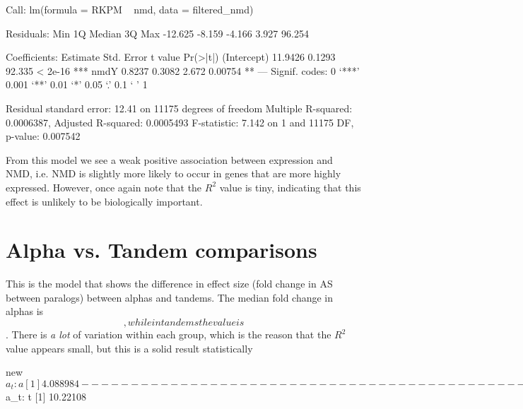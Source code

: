 \documentclass{article}
\begin{document}
\begin{Schunk}
\begin{Soutput}
Call:
lm(formula = RKPM ~ nmd, data = filtered_nmd)

Residuals:
    Min      1Q  Median      3Q     Max 
-12.625  -8.159  -4.166   3.927  96.254 

Coefficients:
            Estimate Std. Error t value Pr(>|t|)    
(Intercept)  11.9426     0.1293  92.335  < 2e-16 ***
nmdY          0.8237     0.3082   2.672  0.00754 ** 
---
Signif. codes:  0 ‘***’ 0.001 ‘**’ 0.01 ‘*’ 0.05 ‘.’ 0.1 ‘ ’ 1

Residual standard error: 12.41 on 11175 degrees of freedom
Multiple R-squared:  0.0006387,	Adjusted R-squared:  0.0005493 
F-statistic: 7.142 on 1 and 11175 DF,  p-value: 0.007542
\end{Soutput}
\end{Schunk}

From this model we see a weak positive association between expression and NMD, i.e. NMD is slightly more likely to occur in genes that are more highly expressed. However, once again note that the $R^2$ value is tiny, indicating that this effect is unlikely to be biologically important.

\section*{ Alpha vs. Tandem comparisons }

This is the model that shows the difference in effect size (fold change in AS between paralogs) between alphas and tandems. The median fold change in alphas is $$ , while in tandems the value is $$. There is \textit{a lot} of variation within each group, which is the reason that the $R^2$ value appears small, but this is a solid result statistically


\begin{Schunk}
\begin{Soutput}
new$a_t: a
[1] 4.088984
------------------------------------------------------------ 
new$a_t: t
[1] 10.22108
\end{Soutput}
\end{Schunk}
\end{document}

